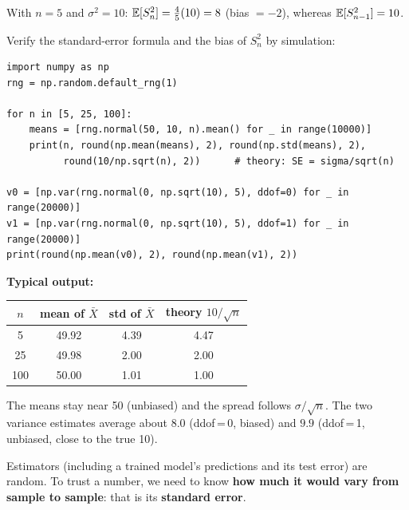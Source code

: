 \begin{example}
With $n=5$ and $\sigma^2=10$: $\mathbb{E}[S_n^2]=\frac45(10)=8$ (bias $=-2$), whereas $\mathbb{E}[S_{n-1}^2]=10$.
\end{example}

\begin{tryit}
Verify the standard-error formula and the bias of $S_n^2$ by simulation:
\begin{lstlisting}
import numpy as np
rng = np.random.default_rng(1)

for n in [5, 25, 100]:
    means = [rng.normal(50, 10, n).mean() for _ in range(10000)]
    print(n, round(np.mean(means), 2), round(np.std(means), 2),
          round(10/np.sqrt(n), 2))      # theory: SE = sigma/sqrt(n)

v0 = [np.var(rng.normal(0, np.sqrt(10), 5), ddof=0) for _ in range(20000)]
v1 = [np.var(rng.normal(0, np.sqrt(10), 5), ddof=1) for _ in range(20000)]
print(round(np.mean(v0), 2), round(np.mean(v1), 2))
\end{lstlisting}
\textbf{Typical output:}
\begin{center}
\begin{tabular}{@{}cccc@{}}
\toprule
$n$ & mean of $\bar X$ & std of $\bar X$ & theory $10/\sqrt n$\\
\midrule
5 & 49.92 & 4.39 & 4.47\\
25 & 49.98 & 2.00 & 2.00\\
100 & 50.00 & 1.01 & 1.00\\
\bottomrule
\end{tabular}
\end{center}
The means stay near 50 (unbiased) and the spread follows $\sigma/\sqrt n$. The two variance estimates average about $8.0$ (ddof\,=\,0, biased) and $9.9$ (ddof\,=\,1, unbiased, close to the true 10).
\end{tryit}

\begin{keyidea}
Estimators (including a trained model's predictions and its test error) are random. To trust a number, we need to know \textbf{how much it would vary from sample to sample}: that is its \textbf{standard error}.
\end{keyidea}

